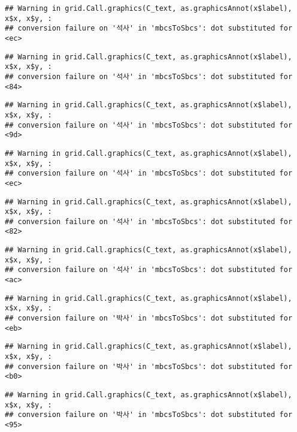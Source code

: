 \documentclass[
]{article}
\begin{document}
\begin{verbatim}
## Warning in grid.Call.graphics(C_text, as.graphicsAnnot(x$label), x$x, x$y, :
## conversion failure on '석사' in 'mbcsToSbcs': dot substituted for <ec>
\end{verbatim}

\begin{verbatim}
## Warning in grid.Call.graphics(C_text, as.graphicsAnnot(x$label), x$x, x$y, :
## conversion failure on '석사' in 'mbcsToSbcs': dot substituted for <84>
\end{verbatim}

\begin{verbatim}
## Warning in grid.Call.graphics(C_text, as.graphicsAnnot(x$label), x$x, x$y, :
## conversion failure on '석사' in 'mbcsToSbcs': dot substituted for <9d>
\end{verbatim}

\begin{verbatim}
## Warning in grid.Call.graphics(C_text, as.graphicsAnnot(x$label), x$x, x$y, :
## conversion failure on '석사' in 'mbcsToSbcs': dot substituted for <ec>
\end{verbatim}

\begin{verbatim}
## Warning in grid.Call.graphics(C_text, as.graphicsAnnot(x$label), x$x, x$y, :
## conversion failure on '석사' in 'mbcsToSbcs': dot substituted for <82>
\end{verbatim}

\begin{verbatim}
## Warning in grid.Call.graphics(C_text, as.graphicsAnnot(x$label), x$x, x$y, :
## conversion failure on '석사' in 'mbcsToSbcs': dot substituted for <ac>
\end{verbatim}

\begin{verbatim}
## Warning in grid.Call.graphics(C_text, as.graphicsAnnot(x$label), x$x, x$y, :
## conversion failure on '박사' in 'mbcsToSbcs': dot substituted for <eb>
\end{verbatim}

\begin{verbatim}
## Warning in grid.Call.graphics(C_text, as.graphicsAnnot(x$label), x$x, x$y, :
## conversion failure on '박사' in 'mbcsToSbcs': dot substituted for <b0>
\end{verbatim}

\begin{verbatim}
## Warning in grid.Call.graphics(C_text, as.graphicsAnnot(x$label), x$x, x$y, :
## conversion failure on '박사' in 'mbcsToSbcs': dot substituted for <95>
\end{verbatim}
\end{document}

